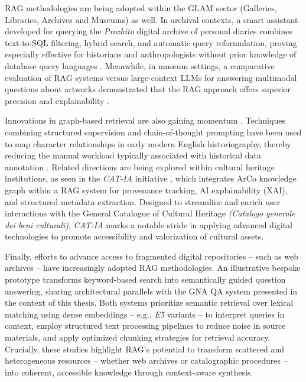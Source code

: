 \begin{spacing}{1.5}
RAG methodologies are being adopted within the GLAM sector (Galleries, Libraries, Archives and Museums) as well. In archival contexts, a smart assistant developed for querying the \textit{Prozhito} digital archive of personal diaries combines text-to-SQL filtering, hybrid search, and automatic query reformulation, proving especially effective for historians and anthropologists without prior knowledge of database query languages  \citep{sergeev_talking_2025}. Meanwhile, in museum settings, a comparative evaluation of RAG systems versus large-context LLMs for answering multimodal questions about artworks demonstrated that the RAG approach offers superior precision and explainability \citep{ramos-varela_context_2025}.

Innovations in graph-based retrieval are also gaining momentum \citep{belagatti_enhance_2024}. Techniques combining structured supervision and chain-of-thought prompting have been used to map character relationships in early modern English historiography, thereby reducing the manual workload typically associated with historical data annotation \citep{fan_research_2025}. Related directions are being explored within cultural heritage institutions, as seen in the \textit{CAT-IA} initiative \citep{barbato_nasce_2025}, which integrates ArCo knowledge graph \citep{carriero_arco_2019} within a RAG system for provenance tracking, AI explainability (XAI), and structured metadata extraction. Designed to streamline and enrich user interactions with the General Catalogue of Cultural Heritage \textit{(Catalogo generale dei beni culturali)}, \textit{CAT-IA} marks a notable stride in applying advanced digital technologies to promote accessibility and valorization of cultural assets.

Finally, efforts to advance access to fragmented digital repositories -- such as web archives -- have increasingly adopted RAG methodologies. An illustrative bespoke prototype \citep{davis_unlocking_2025} transforms keyword-based search into semantically guided question answering, sharing architectural parallels with the GNA QA system presented in the context of this thesis. Both systems prioritize semantic retrieval over lexical matching using dense embeddings -- e.g., \textit{E5} variants \citep{wang_text_2024} -- to interpret queries in context, employ structured text processing pipelines to reduce noise in source materials, and apply optimized chunking strategies for retrieval accuracy. Crucially, these studies highlight RAG’s potential to transform scattered and heterogeneous resources -- whether web archives or catalographic procedures -- into coherent, accessible knowledge through context-aware synthesis.


\end{spacing}
